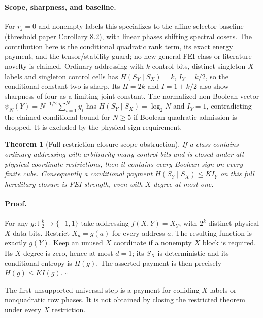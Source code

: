 \documentclass{article}
\newtheorem{theorem}{Theorem}
\begin{document}
\paragraph{Scope, sharpness, and baseline.}
For $r_j=0$ and nonempty labels this specializes to the affine-selector
baseline (threshold paper Corollary 8.2), with linear phases shifting
spectral cosets. The contribution here is the conditional quadratic
rank term, its exact energy payment, and the tensor/stability guard;
no new general FEI class or literature novelty is claimed.
Ordinary addressing with $k$ control bits, distinct singleton $X$
labels and singleton control cells has $H(S_Y\mid S_X)=k$,
$I_Y=k/2$, so the conditional constant two is sharp. Its $H=2k$
and $I=1+k/2$ also show sharpness of four as a limiting joint constant.
The normalized non-Boolean vector
$\psi_N(Y)=N^{-1/2}\sum_{i=1}^N y_i$ has
$H(S_Y\mid S_X)=\log_2N$ and $I_Y=1$, contradicting the claimed
conditional bound for $N\ge5$ if Boolean quadratic admission is
dropped. It is excluded by the physical sign requirement.

\begin{theorem}[Full restriction-closure scope obstruction]
If a class contains ordinary addressing with arbitrarily many control
bits and is closed under all physical coordinate restrictions, then it
contains every Boolean sign on every finite cube. Consequently a
conditional payment $H(S_Y\mid S_X)\le K I_Y$ on this full hereditary
closure is FEI-strength, even with $X$-degree at most one.
\end{theorem}
\paragraph{Proof.}
For any $g:\mathbb F_2^k\to\{-1,1\}$ take addressing
$f(X,Y)=X_Y$, with $2^k$ distinct physical $X$ data bits. Restrict
$X_a=g(a)$ for every address $a$. The resulting function is exactly
$g(Y)$. Keep an unused $X$ coordinate if a nonempty $X$ block is
required. Its $X$ degree is zero, hence at most $d=1$; its $S_X$
is deterministic and its conditional entropy is $H(g)$.
The asserted payment is then precisely $H(g)\le K I(g)$.
\hfill$\square$

The first unsupported universal step is a payment for colliding
$X$ labels or nonquadratic row phases. It is not obtained by closing
the restricted theorem under every $X$ restriction.
\end{document}
